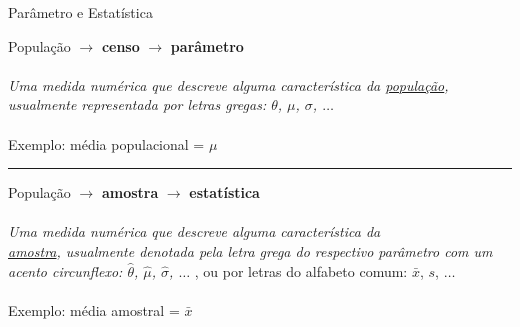 \documentclass[10pt]{beamer}\usepackage[]{graphicx}\usepackage[]{color}
\theoremstyle{definition}
\begin{document}
\begin{frame}{Parâmetro e Estatística}
  \begin{center}
    População $\rightarrow$ \textbf{censo} $\rightarrow$
    \textbf{parâmetro} \\~\\
    \textsl{Uma medida numérica que descreve alguma
      característica da \underline{população}, usualmente representada
      por letras gregas: $\theta$, $\mu$, $\sigma$, $\ldots$} \\~\\
    Exemplo: média populacional = $\mu$
  \end{center}
  \vspace{1em}
  \hrule
  \vspace{1em}
  \begin{center}
    População $\rightarrow$ \textbf{amostra} $\rightarrow$
    \textbf{estatística}  \\~\\
    \textsl{Uma medida numérica que descreve alguma
      característica da \\ \underline{amostra}, usualmente denotada pela
    letra grega do respectivo parâmetro com um acento circunflexo:
    $\hat\theta$, $\hat\mu$, $\hat\sigma$, $\ldots$} , ou por letras do
  alfabeto comum: $\bar x$, $s$, $\ldots$\\~\\
    Exemplo: média amostral = $\bar{x}$
  \end{center}
\end{frame}

\end{document}
